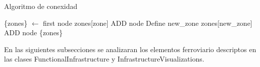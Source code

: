     \begin{algorithm}[H]
        \caption{Algoritmo de conexidad}
        \label{alg:connectedness}
        \begin{algorithmic}
            \STATE \{zones\} $\gets$ first node
                            \STATE zones[zone] ADD node
                        \ELSE
                            \STATE Define new\_zone
                            \STATE zones[new\_zone] ADD node
                        \ENDIF
                    \ENDIF
                \ENDFOR
            \ENDFOR 
            \OUTPUT \{zones\}   
        \end{algorithmic}
    \end{algorithm}
        
    En las siguientes subsecciones se analizaran los elementos ferroviario descriptos en las clases FunctionalInfrastructure y InfrastructureVisualizations.